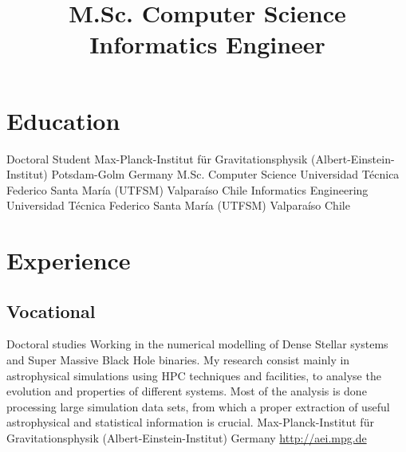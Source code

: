 \documentclass[12pt,a4paper]{moderncv}
\title{\Large M.Sc. Computer Science\newline
Informatics Engineer}
\newcommand{\utfsm}{Universidad Técnica Federico Santa María (UTFSM)}
\newcommand{\gray}{\textcolor{gray}}
\newcommand{\myurl}[1]{\gray{\url{#1}}}
\newcommand{\aei}{Max-Planck-Institut für Gravitationsphysik (Albert-Einstein-Institut)}
\newcommand{\cc}{\textcolor{color1}}
\begin{document}
\maketitle

\vspace{-1cm}
\section{\LARGE Education}

\cventry{\cc{\textbf{2013 to\\ present}}}
        {Doctoral Student}
        {\aei}
        {}
        {Potsdam-Golm}
        {Germany}
        {M.Sc. Computer Science}
        {{\utfsm}}
        {}
        {Valparaíso}
        {Chile}
        {Informatics Engineering}
        {{\utfsm}}
        {}
        {Valparaíso}
        {Chile}


\section{\LARGE Experience}
\subsection{\Large Vocational}
\vspace{0.3cm}

        {Doctoral studies}
        {Working in the numerical modelling of \cc{Dense Stellar systems}
        and \cc{Super Massive Black Hole} binaries.\newline
        My research consist mainly in astrophysical simulations using \cc{HPC}
        techniques and facilities, to analyse the evolution and properties
        of different systems.\newline
        Most of the \cc{analysis} is done processing large simulation data sets,
        from which a proper extraction of useful astrophysical and statistical
        information is crucial.
        }
        {\aei}
        {Germany}
        {\myurl{http://aei.mpg.de}}
\end{document}
